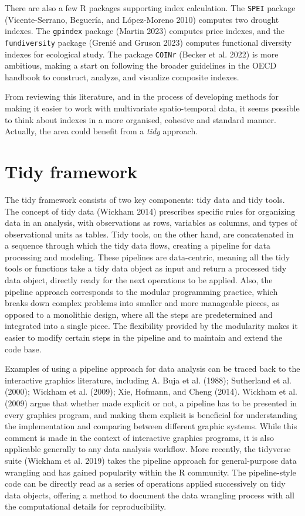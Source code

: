 \documentclass[
]{interact}
\begin{document}
There are also a few R packages supporting index calculation. The
\texttt{SPEI} package (Vicente-Serrano, Beguería, and López-Moreno 2010)
computes two drought indexes. The \texttt{gpindex} package (Martin 2023)
computes price indexes, and the \texttt{fundiversity} package (Grenié
and Gruson 2023) computes functional diversity indexes for ecological
study. The package \texttt{COINr} (Becker et al. 2022) is more
ambitious, making a start on following the broader guidelines in the
OECD handbook to construct, analyze, and visualize composite indexes.

From reviewing this literature, and in the process of developing methods
for making it easier to work with multivariate spatio-temporal data, it
seems possible to think about indexes in a more organised, cohesive and
standard manner. Actually, the area could benefit from a \emph{tidy}
approach.

\hypertarget{sec-tidy}{%
\section{Tidy framework}\label{sec-tidy}}

The tidy framework consists of two key components: tidy data and tidy
tools. The concept of tidy data (Wickham 2014) prescribes specific rules
for organizing data in an analysis, with observations as rows, variables
as columns, and types of observational units as tables. Tidy tools, on
the other hand, are concatenated in a sequence through which the tidy
data flows, creating a pipeline for data processing and modeling. These
pipelines are data-centric, meaning all the tidy tools or functions take
a tidy data object as input and return a processed tidy data object,
directly ready for the next operations to be applied. Also, the pipeline
approach corresponds to the modular programming practice, which breaks
down complex problems into smaller and more manageable pieces, as
opposed to a monolithic design, where all the steps are predetermined
and integrated into a single piece. The flexibility provided by the
modularity makes it easier to modify certain steps in the pipeline and
to maintain and extend the code base.

Examples of using a pipeline approach for data analysis can be traced
back to the interactive graphics literature, including A. Buja et al.
(1988); Sutherland et al. (2000); Wickham et al. (2009); Xie, Hofmann,
and Cheng (2014). Wickham et al. (2009) argue that whether made explicit
or not, a pipeline has to be presented in every graphics program, and
making them explicit is beneficial for understanding the implementation
and comparing between different graphic systems. While this comment is
made in the context of interactive graphics programs, it is also
applicable generally to any data analysis workflow. More recently, the
tidyverse suite (Wickham et al. 2019) takes the pipeline approach for
general-purpose data wrangling and has gained popularity within the R
community. The pipeline-style code can be directly read as a series of
operations applied successively on tidy data objects, offering a method
to document the data wrangling process with all the computational
details for reproducibility.
\end{document}
